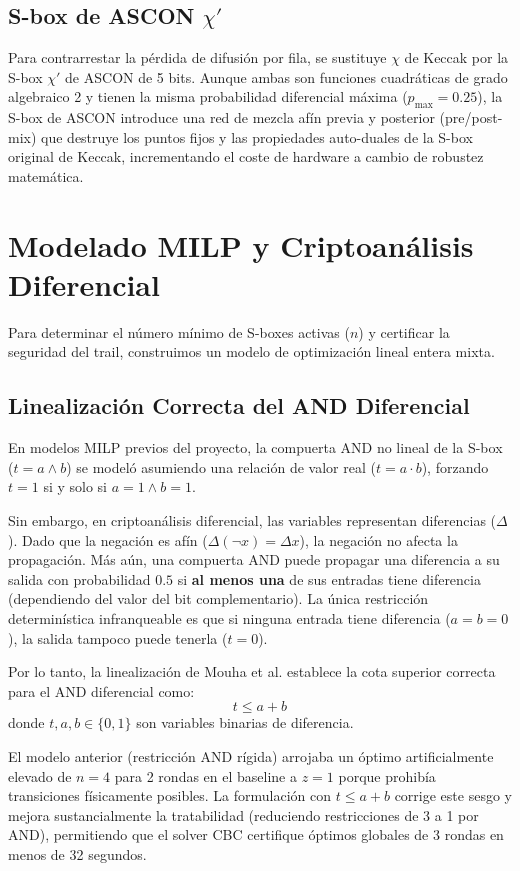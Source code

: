 \documentclass[journal,compsoc]{IEEEtran}
\begin{document}
\subsection{S-box de ASCON $\chi'$}
Para contrarrestar la pérdida de difusión por fila, se sustituye $\chi$ de Keccak por la S-box $\chi'$ de ASCON de 5 bits. Aunque ambas son funciones cuadráticas de grado algebraico 2 y tienen la misma probabilidad diferencial máxima ($p_{\text{max}} = 0.25$), la S-box de ASCON introduce una red de mezcla afín previa y posterior (pre/post-mix) que destruye los puntos fijos y las propiedades auto-duales de la S-box original de Keccak, incrementando el coste de hardware a cambio de robustez matemática.

\section{Modelado MILP y Criptoanálisis Diferencial}

Para determinar el número mínimo de S-boxes activas ($n$) y certificar la seguridad del trail, construimos un modelo de optimización lineal entera mixta.

\subsection{Linealización Correcta del AND Diferencial}
En modelos MILP previos del proyecto, la compuerta AND no lineal de la S-box ($t = a \wedge b$) se modeló asumiendo una relación de valor real ($t = a \cdot b$), forzando $t=1$ si y solo si $a=1 \wedge b=1$. 

Sin embargo, en criptoanálisis diferencial, las variables representan diferencias ($\Delta$). Dado que la negación es afín ($\Delta(\neg x) = \Delta x$), la negación no afecta la propagación. Más aún, una compuerta AND puede propagar una diferencia a su salida con probabilidad $0.5$ si \textbf{al menos una} de sus entradas tiene diferencia (dependiendo del valor del bit complementario). La única restricción determinística infranqueable es que si ninguna entrada tiene diferencia ($a=b=0$), la salida tampoco puede tenerla ($t=0$). 

Por lo tanto, la linealización de Mouha et al. \cite{mouha} establece la cota superior correcta para el AND diferencial como:
\begin{equation}
    t \le a + b
\end{equation}
donde $t, a, b \in \{0,1\}$ son variables binarias de diferencia. 

El modelo anterior (restricción AND rígida) arrojaba un óptimo artificialmente elevado de $n=4$ para 2 rondas en el baseline a $z=1$ porque prohibía transiciones físicamente posibles. La formulación con $t \le a+b$ corrige este sesgo y mejora sustancialmente la tratabilidad (reduciendo restricciones de 3 a 1 por AND), permitiendo que el solver CBC certifique óptimos globales de 3 rondas en menos de 32 segundos.
\end{document}
